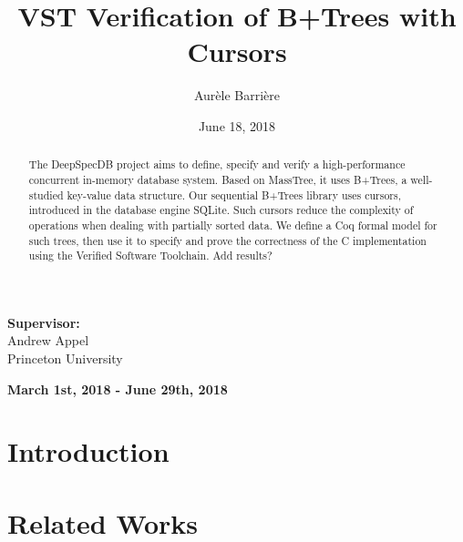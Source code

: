 \documentclass{llncs2e/llncs}
\begin{document}
\setcounter{page}{0}
\pagestyle{headings}
\title{VST Verification of B+Trees with Cursors}
\author{Aur\`ele Barri\`ere}
\date{June 18, 2018}
\maketitle
\begin{center}
  \textbf{Supervisor: }\\
  Andrew Appel
  ~\\
  Princeton University
\end{center}
\begin{center}
  \textbf{March 1st, 2018 - June 29th, 2018}
\end{center}
\vfill
\begin{abstract}
  The DeepSpecDB project aims to define, specify and verify a high-performance concurrent in-memory database system.
  Based on MassTree, it uses B+Trees, a well-studied key-value data structure.
  Our sequential B+Trees library uses cursors, introduced in the database engine SQLite.
  Such cursors reduce the complexity of operations when dealing with partially sorted data.
  We define a Coq formal model for such trees, then use it to specify and prove the correctness of the C implementation using the Verified Software Toolchain.
  {\color{red}Add results?}
  
\end{abstract}
\vfill
\newpage

\def\btree{B+Tree}
\def\btrees{B+Trees}
\def\todo#1{{\color{red}#1}}
\def\btrep{\texttt{btnode\_rep}}
\newcommand{\wand}{\mathrel{-\hspace{-.7ex}*}}

%


\section{Introduction}
\label{sec:intro}


\section{Related Works}
\label{sec:related}

\end{document}
